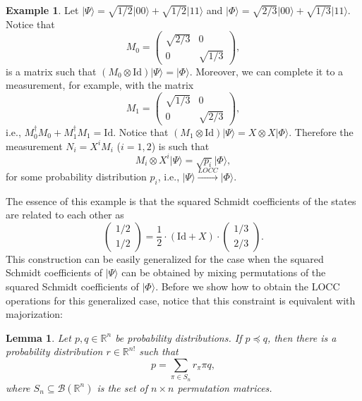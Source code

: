 \documentclass{article}
\newtheorem{lemma}{Lemma}
\theoremstyle{definition}
\newtheorem{example}{Example}
\newcommand{\id}{\mathrm{Id}}
\newcommand{\ket}[1]{\vert #1 \rangle}
\newcommand{\bounded}[1]{\mathcal{B}(#1)}
\begin{document}
\begin{example}
  Let $\ket{\Psi} =  \sqrt{1/2} \ket{00} + \sqrt{1/2}\ket{11}$ and $\ket{\Phi} = \sqrt{2/3} \ket{00} + \sqrt{1/3}\ket{11}$. Notice that 
  \begin{equation*}
    M_0 = \left( \begin{matrix}
      \sqrt{2/3} & 0 \\ 0 & \sqrt{1/3}
    \end{matrix} \right),
  \end{equation*}
  is a matrix such that $(M_0\otimes \id) \ket{\Psi} = \ket{\Phi}$. Moreover, we can complete it to a measurement, for example,  with the matrix
  \begin{equation*}
    M_1 = \left( \begin{matrix}
      \sqrt{1/3} & 0 \\ 0 & \sqrt{2/3}
    \end{matrix} \right),
  \end{equation*}
  i.e., $M_0^\dagger M_0 + M_1^\dagger M_1  = \id$.  Notice that $(M_1\otimes \id) \ket{\Psi} = X\otimes X\ket{\Phi}$. Therefore the measurement $N_i = X^i M_i$ ($i=1,2$) is such that 
  \begin{equation*}
    M_i \otimes X^i \ket{\Psi} = \sqrt{p_i} \ket{\Phi},
  \end{equation*}
  for some probability distribution $p_i$, i.e., $\ket{\Psi}\xrightarrow{LOCC}\ket{\Phi}$.
\end{example}
The essence of this example is that the squared Schmidt coefficients of the states are related to each other as
\begin{equation*}
   \left(\begin{matrix} 1/2 \\ 1/2 \end{matrix}\right) = \frac{1}{2} \cdot (\id + X) \cdot \left(\begin{matrix} 1/3 \\ 2/3 \end{matrix}\right).
\end{equation*}
This construction can be easily generalized for the case when the squared Schmidt coefficients of $\ket{\Psi}$ can be obtained by mixing permutations of the squared Schmidt coefficients of $\ket{\Phi}$. Before we show how to obtain the LOCC operations for this generalized case, notice that this constraint is equivalent with majorization:


\begin{lemma}\label{lem:majorization=>mixing_permutation}
  Let $p,q\in\mathbb{R}^n$ be probability distributions. If $p\preccurlyeq q$, then there is a probability distribution $r\in\mathbb{R}^{n!}$ such that 
  \begin{equation*}
    p  = \sum_{\pi \in S_n} r_{\pi} \pi q,
  \end{equation*}
  where $S_n\subseteq \bounded{\mathbb{R}^n}$ is the set of $n\times n$ permutation matrices. 
\end{lemma}
\end{document}

